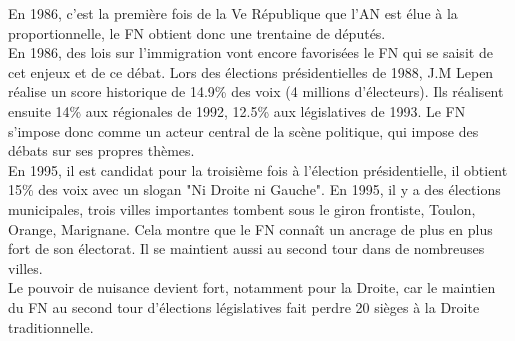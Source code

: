 \documentclass[10pt, a4paper, openany]{book}
\begin{document}
En 1986, c'est la première fois de la Ve République que l'AN est élue à la proportionnelle, le FN obtient donc une trentaine de députés. \\
En 1986, des lois sur l'immigration vont encore favorisées le FN qui se saisit de cet enjeux et de ce débat. Lors des élections présidentielles de 1988, J.M Lepen réalise un score historique de 14.9\% des voix (4 millions d'électeurs). Ils réalisent ensuite 14\% aux régionales de 1992, 12.5\% aux législatives de 1993. Le FN s'impose donc comme un acteur central de la scène politique, qui impose des débats sur ses propres thèmes. \\
En 1995, il est candidat pour la troisième fois à l'élection présidentielle, il obtient 15\% des voix avec un slogan "Ni Droite ni Gauche". En 1995, il y a des élections municipales, trois villes importantes tombent sous le giron frontiste, Toulon, Orange, Marignane. Cela montre que le FN connaît un ancrage de plus en plus fort de son électorat. Il se maintient aussi au second tour dans de nombreuses villes. \\
Le pouvoir de nuisance devient fort, notamment pour la Droite, car le maintien du FN au second tour d'élections législatives fait perdre 20 sièges à la Droite traditionnelle. 
\end{document}
